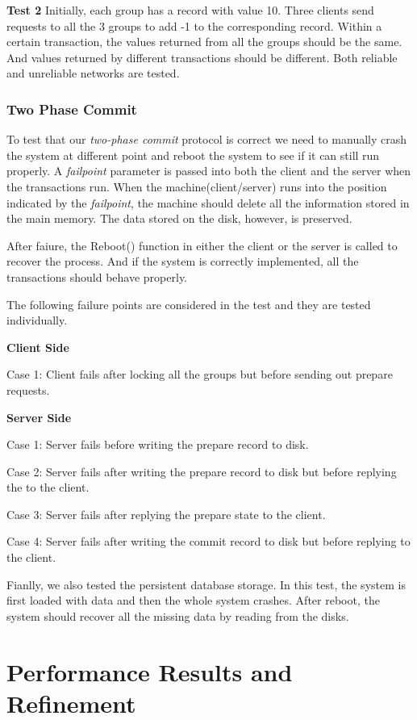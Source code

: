 \documentclass{vldb}
\begin{document}
\textbf{Test 2} Initially, each group has a record with value 10.  
Three clients send requests to all the 3 groups to add -1 to the 
corresponding record. Within a certain transaction, the values 
returned from all the groups should be the same. And values returned 
by different transactions should be different. Both reliable and 
unreliable networks are tested.

\subsubsection{Two Phase Commit}

To test that our \textit{two-phase commit} protocol is correct we need 
to manually crash the system at different point and reboot the system 
to see if it can still run properly. A \textit{failpoint} parameter is 
passed into both the client and the server when the transactions run.  
When the machine(client/server) runs into the position indicated by 
the \textit{failpoint}, the machine should delete all the information 
stored in the main memory. The data stored on the disk, however, is 
preserved.

After faiure, the Reboot() function in either the client or the server 
is called to recover the process. And if the system is correctly 
implemented, all the transactions should behave properly.

The following failure points are considered in the test and they are 
tested individually.

\textbf{Client Side}

Case 1: Client fails after locking all the groups but before sending 
out prepare requests.

\textbf{Server Side}

Case 1: Server fails before writing the prepare record to disk.

Case 2: Server fails after writing the prepare record to disk but 
before replying the to the client.

Case 3: Server fails after replying the prepare state to the client.

Case 4: Server fails after writing the commit record to disk but 
before replying to the client.

Fianlly, we also tested the persistent database storage. In this test, 
the system is first loaded with data and then the whole system 
crashes. After reboot, the system should recover all the missing data 
by reading from the disks. 

\section{Performance Results and Refinement}
\end{document}
